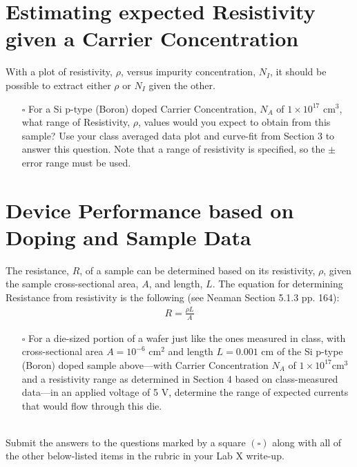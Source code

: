 \documentclass[12pt]{../manual}
\begin{document}
\newpage
\section{Estimating expected Resistivity given a Carrier Concentration}

With a plot of resistivity, $\rho$, versus impurity concentration, $N_I$, it should be possible to extract either $\rho$ or $N_I$ given the other.

\begin{itemize}
\item[$\square$] For a Si p-type (Boron) doped Carrier Concentration, $N_A$ of $1 \times 10^{17} \mbox{ cm}^3$, what range of Resistivity, $\rho$, values would you expect to obtain from this sample? Use your class averaged data plot and curve-fit from Section 3 to answer this question. Note that a range of resistivity is specified, so the $\pm$ error range must be used.
\end{itemize}

\section{Device Performance based on Doping and Sample Data}

The resistance, $R$, of a sample can be determined based on its resistivity, $\rho$, given the sample cross-sectional area, $A$, and length, $L$. The equation for determining Resistance from resistivity is the following (see Neaman Section 5.1.3 pp. 164):
\begin{align}
R = \frac{\rho L}{A}
\end{align}

\begin{itemize}
\item[$\square$] For a die-sized portion of a wafer just like the ones measured in class, with cross-sectional area $A = 10^{-6} \mbox{ cm}^2$ and length $L = 0.001$ cm of the Si p-type (Boron) doped sample above---with Carrier Concentration $N_A$ of $1 \times 10^{17} \mbox{cm}^3$ and a resistivity range as determined in Section 4 based on class-measured data---in an applied voltage of 5 V, determine the range of expected currents that would flow through this die.
\end{itemize}

~\\Submit the answers to the questions marked by a square $(\square)$ along with all of the other below-listed items in the rubric in your Lab X write-up. 
\end{document}
